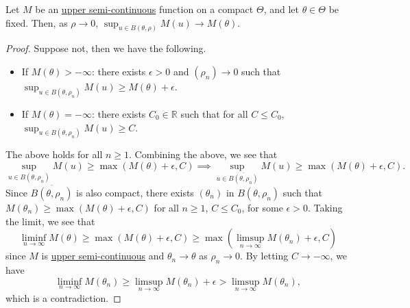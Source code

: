 \begin{proposition}\label{prop:lec25}
	Let \(M\) be an \hyperref[def:upper-semi-continuous]{upper semi-continuous} function on a compact \(\Theta \), and let \(\theta \in \Theta \) be fixed. Then, as \(\rho \to 0\), \(\sup _{u \in B(\theta , \rho )} M(u) \to M(\theta )\).
\end{proposition}
\begin{proof}
	Suppose not, then we have the following.

	\begin{itemize}
		\item If \(M(\theta ) > -\infty \): there exists \(\epsilon > 0\) and \((\rho _n) \to 0\) such that \(\sup _{u \in B(\theta , \rho _n)} M(u) \geq M(\theta ) + \epsilon\).
		\item If \(M(\theta ) = -\infty \): there exists \(C_0 \in \mathbb{R} \) such that for all \(C \leq C_0\), \(\sup _{u \in B(\theta , \rho _n)}M(u) \geq C\).
	\end{itemize}
	The above holds for all \(n \geq 1\). Combining the above, we see that
	\[
		\sup _{u \in B(\theta , \rho _n)} M(u)
		\geq \max (M(\theta ) + \epsilon , C)
		\implies \sup _{u \in \overline{B(\theta , \rho _n)} } M(u)
		\geq \max (M(\theta ) + \epsilon , C).
	\]
	Since \(\overline{B(\theta , \rho _n)} \) is also compact, there exists \((\theta _n)\) in \(B(\theta , \rho _n)\) such that \(M(\theta _n) \geq \max (M(\theta ) + \epsilon , C)\) for all \(n \geq 1\), \(C \leq C_0\), for some \(\epsilon > 0\). Taking the limit, we see that
	\[
		\liminf_{n \to \infty} M(\theta )
		\geq \max (M(\theta ) + \epsilon , C)
		\geq \max \left( \limsup_{n \to \infty} M(\theta _n) + \epsilon , C \right)
	\]
	since \(M\) is \hyperref[def:upper-semi-continuous]{upper semi-continuous} and \(\theta _n \to \theta \) as \(\rho _n \to 0\). By letting \(C \to -\infty \), we have
	\[
		\liminf_{n \to \infty} M(\theta _n)
		\geq \limsup_{n \to \infty} M(\theta _n) + \epsilon
		> \limsup_{n \to \infty} M(\theta _n),
	\]
	which is a contradiction.
\end{proof}

